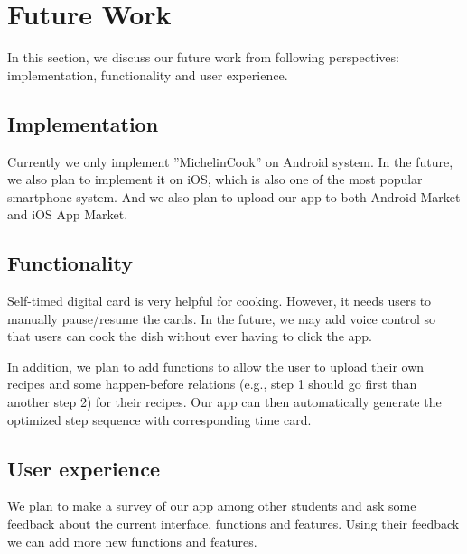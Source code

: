 \section{Future Work}

In this section, we discuss our future work from following perspectives: implementation, functionality and user experience.

\subsection{Implementation}
Currently we only implement ''MichelinCook'' on Android system. In the future, we also plan to implement it on iOS, which is also one of the most popular smartphone system. And we also plan to upload our app to both Android Market and iOS App Market.

\subsection{Functionality}
Self-timed digital card is very helpful for cooking. However, it needs users to manually pause/resume the cards. In the future, we may add voice control so that users can cook the dish without ever having to click the app.

In addition, we plan to add functions to allow the user to upload their own recipes and some happen-before  relations (e.g.,  step 1 should go first than another step 2) for  their recipes. Our app can then automatically generate the optimized step sequence with corresponding time card.

\subsection{User experience}
We plan to make a survey of our app among other students and ask some feedback about the current interface, functions and features. Using their feedback we can add more new functions and features.